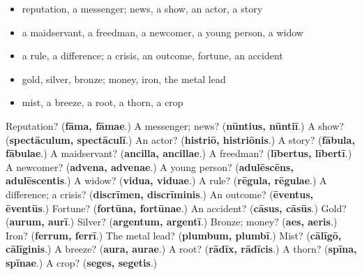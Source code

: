 \begin{itemize}
\raggedright
  \item reputation, a messenger; news, a show, an actor, a story
  \item a maidservant, a freedman, a newcomer, a young person, a widow
  \item a rule, a difference; a crisis, an outcome, fortune, an accident
  \item gold, silver, bronze; money, iron, the metal lead
  \item mist, a breeze, a root, a thorn, a crop
\end{itemize}

\begin{tcolorbox}[breakable,colback=teal!4,colframe=teal!35!black,title={Before you move on}]
Reputation? (\textbf{fāma, fāmae}.) A messenger; news? (\textbf{nūntius, nūntiī}.) A show? (\textbf{spectāculum, spectāculī}.) An actor? (\textbf{histriō, histriōnis}.) A story? (\textbf{fābula, fābulae}.) A maidservant? (\textbf{ancilla, ancillae}.) A freedman? (\textbf{lībertus, lībertī}.) A newcomer? (\textbf{advena, advenae}.) A young person? (\textbf{adulēscēns, adulēscentis}.) A widow? (\textbf{vidua, viduae}.) A rule? (\textbf{rēgula, rēgulae}.) A difference; a crisis? (\textbf{discrīmen, discrīminis}.) An outcome? (\textbf{ēventus, ēventūs}.) Fortune? (\textbf{fortūna, fortūnae}.) An accident? (\textbf{cāsus, cāsūs}.) Gold? (\textbf{aurum, aurī}.) Silver? (\textbf{argentum, argentī}.) Bronze; money? (\textbf{aes, aeris}.) Iron? (\textbf{ferrum, ferrī}.) The metal lead? (\textbf{plumbum, plumbī}.) Mist? (\textbf{cālīgō, cālīginis}.) A breeze? (\textbf{aura, aurae}.) A root? (\textbf{rādīx, rādīcis}.) A thorn? (\textbf{spīna, spīnae}.) A crop? (\textbf{seges, segetis}.)
\end{tcolorbox}
